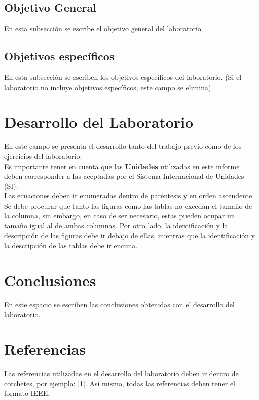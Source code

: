 \documentclass[conference]{IEEEtran}
\begin{document}
\subsection{Objetivo General}

En esta subsección se escribe el objetivo general del laboratorio.

\subsection{Objetivos específicos}

En esta subsección se escriben los objetivos específicos del laboratorio. (Si el laboratorio no incluye objetivos específicos, este campo se elimina).

\section{Desarrollo del Laboratorio}
En este campo se presenta el desarrollo tanto del trabajo previo como de los ejercicios del laboratorio.\\

Es importante tener en cuenta que las \textbf{Unidades} utilizadas en este informe deben corresponder a las aceptadas por el Sistema Internacional de Unidades (SI).\\

Las ecuaciones deben ir enumeradas dentro de paréntesis y en orden ascendente.\\

Se debe procurar que tanto las figuras como las tablas no excedan el tamaño de la columna, sin embargo, en caso de ser necesario, estas pueden ocupar un tamaño igual al de ambas columnas. Por otro lado, la identificación y la descripción de las figuras debe ir debajo de ellas, mientras que la identificación y la descripción de las tablas debe ir encima.

\section{Conclusiones}
En este espacio se escriben las conclusiones obtenidas con el desarrollo del laboratorio.

\section*{Referencias}

Las referencias utilizadas en el desarrollo del laboratorio deben ir dentro de corchetes, por ejemplo: [1]. Así mismo, todas las referencias deben tener el formato IEEE.

\begin{comment}

con las siguientes líneas de código se agregan las referencias del informe de laboratorio.




\end{comment}
\end{document}
